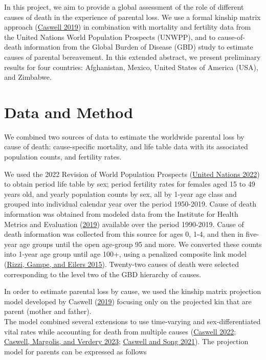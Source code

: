 \documentclass[
  11pt,
  letterpaper,
]{article}
\begin{document}
In this project, we aim to provide a global assessment of the role of different causes of death in the experience of parental loss. We use a formal kinship matrix approach (\protect\hyperlink{ref-caswell2019formal}{Caswell 2019}) in combination with mortality and fertility data from the United Nations World Population Prospects (UNWPP), and to cause-of-death information from the Global Burden of Disease (GBD) study to estimate causes of parental bereavement. In this extended abstract, we present preliminary results for four countries: Afghanistan, Mexico, United States of America (USA), and Zimbabwe.

\hypertarget{data-and-method}{%
\section{Data and Method}\label{data-and-method}}

We combined two sources of data to estimate the worldwide parental loss by cause of death: cause-specific mortality, and life table data with its associated population counts, and fertility rates.

We used the 2022 Revision of World Population Prospects (\protect\hyperlink{ref-united2022world}{United Nations 2022}) to obtain period life table by sex; period fertility rates for females aged 15 to 49 years old, and yearly population counts by sex, all by 1-year age class and grouped into individual calendar year over the period 1950-2019. Cause of death information was obtained from modeled data from the Institute for Health Metrics and Evaluation (\protect\hyperlink{ref-ihme2019gbd}{2019}) available over the period 1990-2019. Cause of death information was collected from this source for ages 0, 1-4, and then in five-year age groups until the open age-group 95 and more. We converted these counts into 1-year age group until age 100+, using a penalized composite link model (\protect\hyperlink{ref-rizzi2015efficient}{Rizzi, Gampe, and Eilers 2015}). Twenty-two causes of death were selected corresponding to the level two of the GBD hierarchy of causes.

In order to estimate parental loss by cause, we used the kinship matrix projection model developed by Caswell (\protect\hyperlink{ref-caswell2019formal}{2019}) focusing only on the projected kin that are parent (mother and father).\\
The model combined several extensions to use time-varying and sex-differentiated vital rates while accounting for death from multiple causes (\protect\hyperlink{ref-caswell2022formal}{Caswell 2022}; \protect\hyperlink{ref-caswell2023formal}{Caswell, Margolis, and Verdery 2023}; \protect\hyperlink{ref-caswell2021formal}{Caswell and Song 2021}). The projection model for parents can be expressed as follows
\end{document}
